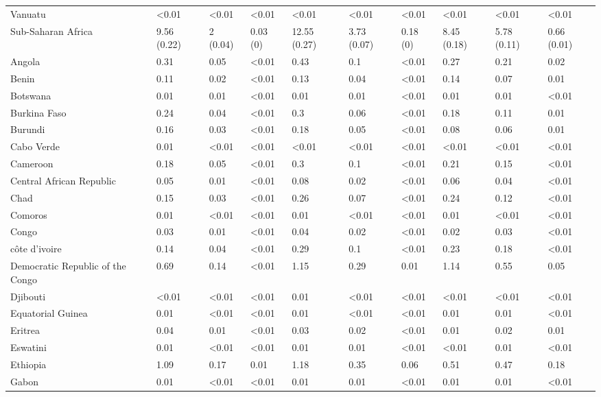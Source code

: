 \begin{longtable}[t]{llllllllll}
Vanuatu & <0.01 & <0.01 & <0.01 & <0.01 & <0.01 & <0.01 & <0.01 & <0.01 & <0.01\\
Sub-Saharan Africa & 9.56 (0.22) & 2 (0.04) & 0.03 (0) & 12.55 (0.27) & 3.73 (0.07) & 0.18 (0) & 8.45 (0.18) & 5.78 (0.11) & 0.66 (0.01)\\
Angola & 0.31 & 0.05 & <0.01 & 0.43 & 0.1 & <0.01 & 0.27 & 0.21 & 0.02\\
\addlinespace
Benin & 0.11 & 0.02 & <0.01 & 0.13 & 0.04 & <0.01 & 0.14 & 0.07 & 0.01\\
Botswana & 0.01 & 0.01 & <0.01 & 0.01 & 0.01 & <0.01 & 0.01 & 0.01 & <0.01\\
Burkina Faso & 0.24 & 0.04 & <0.01 & 0.3 & 0.06 & <0.01 & 0.18 & 0.11 & 0.01\\
Burundi & 0.16 & 0.03 & <0.01 & 0.18 & 0.05 & <0.01 & 0.08 & 0.06 & 0.01\\
Cabo Verde & 0.01 & <0.01 & <0.01 & <0.01 & <0.01 & <0.01 & <0.01 & <0.01 & <0.01\\
\addlinespace
Cameroon & 0.18 & 0.05 & <0.01 & 0.3 & 0.1 & <0.01 & 0.21 & 0.15 & <0.01\\
Central African Republic & 0.05 & 0.01 & <0.01 & 0.08 & 0.02 & <0.01 & 0.06 & 0.04 & <0.01\\
Chad & 0.15 & 0.03 & <0.01 & 0.26 & 0.07 & <0.01 & 0.24 & 0.12 & <0.01\\
Comoros & 0.01 & <0.01 & <0.01 & 0.01 & <0.01 & <0.01 & 0.01 & <0.01 & <0.01\\
Congo & 0.03 & 0.01 & <0.01 & 0.04 & 0.02 & <0.01 & 0.02 & 0.03 & <0.01\\
\addlinespace
côte d'ivoire & 0.14 & 0.04 & <0.01 & 0.29 & 0.1 & <0.01 & 0.23 & 0.18 & <0.01\\
Democratic Republic of the Congo & 0.69 & 0.14 & <0.01 & 1.15 & 0.29 & 0.01 & 1.14 & 0.55 & 0.05\\
Djibouti & <0.01 & <0.01 & <0.01 & 0.01 & <0.01 & <0.01 & <0.01 & <0.01 & <0.01\\
Equatorial Guinea & 0.01 & <0.01 & <0.01 & 0.01 & <0.01 & <0.01 & 0.01 & 0.01 & <0.01\\
Eritrea & 0.04 & 0.01 & <0.01 & 0.03 & 0.02 & <0.01 & 0.01 & 0.02 & 0.01\\
\addlinespace
Eswatini & 0.01 & <0.01 & <0.01 & 0.01 & 0.01 & <0.01 & <0.01 & 0.01 & <0.01\\
Ethiopia & 1.09 & 0.17 & 0.01 & 1.18 & 0.35 & 0.06 & 0.51 & 0.47 & 0.18\\
Gabon & 0.01 & <0.01 & <0.01 & 0.01 & 0.01 & <0.01 & 0.01 & 0.01 & <0.01\\

\end{longtable}
